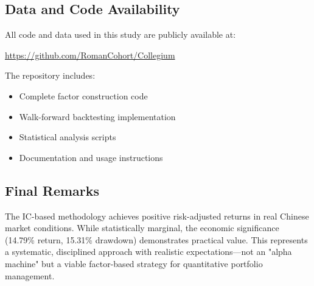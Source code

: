 \subsection{Data and Code Availability}

All code and data used in this study are publicly available at:
\begin{center}
\url{https://github.com/RomanCohort/Collegium}
\end{center}

The repository includes:
\begin{itemize}
    \item Complete factor construction code
    \item Walk-forward backtesting implementation
    \item Statistical analysis scripts
    \item Documentation and usage instructions
\end{itemize}

\subsection{Final Remarks}

The IC-based methodology achieves positive risk-adjusted returns in real Chinese market conditions. While statistically marginal, the economic significance (14.79\% return, 15.31\% drawdown) demonstrates practical value. This represents a systematic, disciplined approach with realistic expectations---not an "alpha machine" but a viable factor-based strategy for quantitative portfolio management.
